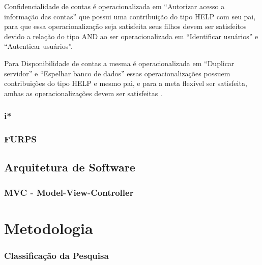 Confidencialidade de contas é operacionalizada em “Autorizar acesso a informação das contas” que possui uma contribuição do tipo HELP com seu pai, para que essa operacionalização seja satisfeita seus filhos devem ser satisfeitos devido a relação do tipo AND ao ser operacionalizada em “Identificar usuários” e “Autenticar usuários”.

Para Disponibilidade de contas a mesma é operacionalizada em “Duplicar servidor” e “Espelhar banco de dados” essas operacionalizações possuem contribuições do tipo HELP e mesmo pai, e para a meta flexível ser satisfeita, ambas as operacionalizações devem ser satisfeitas \cite{affleck2012supporting}. 



\subsection{i*}



\subsection{FURPS}


\section{Arquitetura de Software}

\subsection{MVC - Model-View-Controller}

\chapter{Metodologia}

\subsection{Classificação da Pesquisa}
